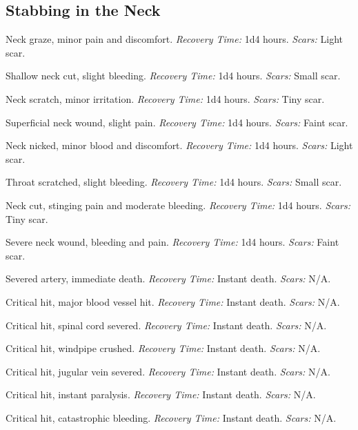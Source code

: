 \documentclass[12pt]{book}  %
\begin{document}
\subsection{Stabbing in the Neck}

\begin{description}[labelwidth=1.5em, leftmargin=*, itemsep=0.4em]
    \item[1 -] Neck graze, minor pain and discomfort. \textit{Recovery Time:} 1d4 hours. \textit{Scars:} Light scar.
    \item[2 -] Shallow neck cut, slight bleeding. \textit{Recovery Time:} 1d4 hours. \textit{Scars:} Small scar.
    \item[3 -] Neck scratch, minor irritation. \textit{Recovery Time:} 1d4 hours. \textit{Scars:} Tiny scar.
    \item[4 -] Superficial neck wound, slight pain. \textit{Recovery Time:} 1d4 hours. \textit{Scars:} Faint scar.
    \item[5 -] Neck nicked, minor blood and discomfort. \textit{Recovery Time:} 1d4 hours. \textit{Scars:} Light scar.
    \item[6 -] Throat scratched, slight bleeding. \textit{Recovery Time:} 1d4 hours. \textit{Scars:} Small scar.
    \item[7 -] Neck cut, stinging pain and moderate bleeding. \textit{Recovery Time:} 1d4 hours. \textit{Scars:} Tiny scar.
    \item[8 -] Severe neck wound, bleeding and pain. \textit{Recovery Time:} 1d4 hours. \textit{Scars:} Faint scar.
    \item[9 -] Severed artery, immediate death. \textit{Recovery Time:} Instant death. \textit{Scars:} N/A.
    \item[10 -] Critical hit, major blood vessel hit. \textit{Recovery Time:} Instant death. \textit{Scars:} N/A.
    \item[11 -] Critical hit, spinal cord severed. \textit{Recovery Time:} Instant death. \textit{Scars:} N/A.
    \item[12 -] Critical hit, windpipe crushed. \textit{Recovery Time:} Instant death. \textit{Scars:} N/A.
    \item[13 -] Critical hit, jugular vein severed. \textit{Recovery Time:} Instant death. \textit{Scars:} N/A.
    \item[14 -] Critical hit, instant paralysis. \textit{Recovery Time:} Instant death. \textit{Scars:} N/A.
    \item[15 -] Critical hit, catastrophic bleeding. \textit{Recovery Time:} Instant death. \textit{Scars:} N/A.

\end{description}
\end{document}
